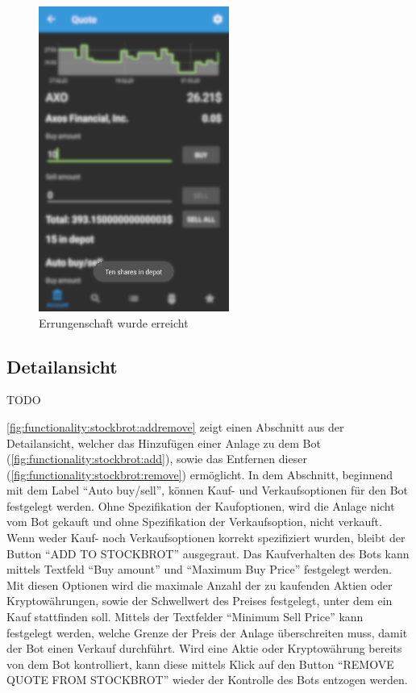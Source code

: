 \documentclass[a4paper]{article}
\begin{document}
\begin{figure}[H]
    \centering
    \includegraphics[height=10cm,keepaspectratio]{./images/achievement_reached.png}
    \caption{Errungenschaft wurde erreicht}
    \label{fig:functionality:achievements:reached}
\end{figure}


\subsection{Detailansicht}
\label{subsec:functionality:quote}
TODO

\autoref{fig:functionality:stockbrot:addremove} zeigt einen Abschnitt aus der Detailansicht, welcher das Hinzufügen einer Anlage zu dem Bot (\autoref{fig:functionality:stockbrot:add}), sowie das Entfernen dieser (\autoref{fig:functionality:stockbrot:remove}) ermöglicht. In dem Abschnitt, beginnend mit dem Label "`Auto buy/sell"', können Kauf- und Verkaufsoptionen für den Bot festgelegt werden. Ohne Spezifikation der Kaufoptionen, wird die Anlage nicht vom Bot gekauft und ohne Spezifikation der Verkaufsoption, nicht verkauft. Wenn weder Kauf- noch Verkaufsoptionen korrekt spezifiziert wurden, bleibt der Button "`ADD TO STOCKBROT"' ausgegraut. Das Kaufverhalten des Bots kann mittels Textfeld "`Buy amount"' und "`Maximum Buy Price"' festgelegt werden. Mit diesen Optionen wird die maximale Anzahl der zu kaufenden Aktien oder Kryptowährungen, sowie der Schwellwert des Preises festgelegt, unter dem ein Kauf stattfinden soll. Mittels der Textfelder "`Minimum Sell Price"' kann festgelegt werden, welche Grenze der Preis der Anlage überschreiten muss, damit der Bot einen Verkauf durchführt. Wird eine Aktie oder Kryptowährung bereits von dem Bot kontrolliert, kann diese mittels Klick auf den Button "`REMOVE QUOTE FROM STOCKBROT"' wieder der Kontrolle des Bots entzogen werden.
\end{document}
